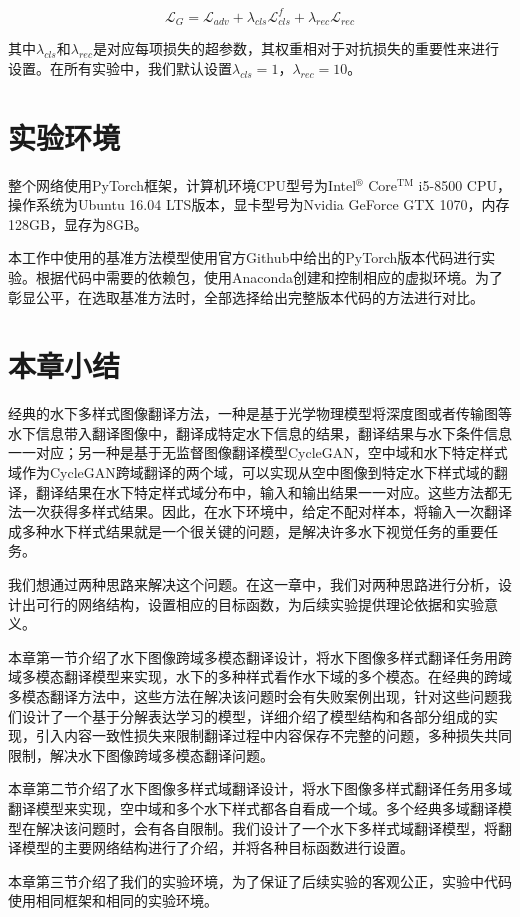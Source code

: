 \begin{equation}
\label{equ:G_exp2}
\mathcal{L}_{G} = \mathcal{L}_{adv}+\lambda_{cls}\mathcal{L}_{cls}^{f}+\lambda_{rec}\mathcal{L}_{rec}
\end{equation}

其中$\lambda_{cls}$和$\lambda_{rec}$是对应每项损失的超参数，其权重相对于对抗损失的重要性来进行设置。在所有实验中，我们默认设置$\lambda_{cls}=1$，$\lambda_{rec}=10$。


\section{实验环境}
整个网络使用PyTorch框架，计算机环境CPU型号为Intel$^\circledR$ Core$^{\text{TM}}$ i5-8500 CPU，操作系统为Ubuntu 16.04 LTS版本，显卡型号为Nvidia GeForce GTX 1070，内存128GB，显存为8GB。

本工作中使用的基准方法模型使用官方Github中给出的PyTorch版本代码进行实验。根据代码中需要的依赖包，使用Anaconda创建和控制相应的虚拟环境。为了彰显公平，在选取基准方法时，全部选择给出完整版本代码的方法进行对比。

\section{本章小结}
经典的水下多样式图像翻译方法，一种是基于光学物理模型将深度图或者传输图等水下信息带入翻译图像中，翻译成特定水下信息的结果，翻译结果与水下条件信息一一对应；另一种是基于无监督图像翻译模型CycleGAN，空中域和水下特定样式域作为CycleGAN跨域翻译的两个域，可以实现从空中图像到特定水下样式域的翻译，翻译结果在水下特定样式域分布中，输入和输出结果一一对应。这些方法都无法一次获得多样式结果。因此，在水下环境中，给定不配对样本，将输入一次翻译成多种水下样式结果就是一个很关键的问题，是解决许多水下视觉任务的重要任务。

我们想通过两种思路来解决这个问题。在这一章中，我们对两种思路进行分析，设计出可行的网络结构，设置相应的目标函数，为后续实验提供理论依据和实验意义。

本章第一节介绍了水下图像跨域多模态翻译设计，将水下图像多样式翻译任务用跨域多模态翻译模型来实现，水下的多种样式看作水下域的多个模态。在经典的跨域多模态翻译方法中，这些方法在解决该问题时会有失败案例出现，针对这些问题我们设计了一个基于分解表达学习的模型，详细介绍了模型结构和各部分组成的实现，引入内容一致性损失来限制翻译过程中内容保存不完整的问题，多种损失共同限制，解决水下图像跨域多模态翻译问题。

本章第二节介绍了水下图像多样式域翻译设计，将水下图像多样式翻译任务用多域翻译模型来实现，空中域和多个水下样式都各自看成一个域。多个经典多域翻译模型在解决该问题时，会有各自限制。我们设计了一个水下多样式域翻译模型，将翻译模型的主要网络结构进行了介绍，并将各种目标函数进行设置。

本章第三节介绍了我们的实验环境，为了保证了后续实验的客观公正，实验中代码使用相同框架和相同的实验环境。
